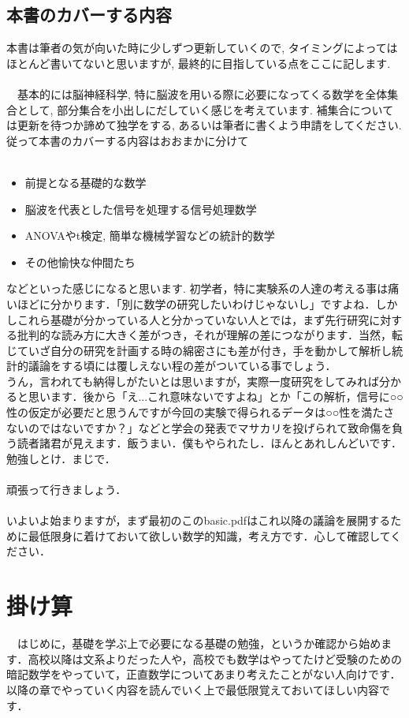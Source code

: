 \documentclass[11pt,a4paper]{jreport}
\begin{document}
\section{本書のカバーする内容}
本書は筆者の気が向いた時に少しずつ更新していくので, タイミングによってはほとんど書いてないと思いますが, 最終的に目指している点をここに記します.\\
\\
　基本的には脳神経科学, 特に脳波を用いる際に必要になってくる数学を全体集合として, 部分集合を小出しにだしていく感じを考えています. 補集合については更新を待つか諦めて独学をする, あるいは筆者に書くよう申請をしてください. 従って本書のカバーする内容はおおまかに分けて\\
\\
\begin{screen}
\begin{itemize}
 \item 前提となる基礎的な数学
 \item 脳波を代表とした信号を処理する信号処理数学
 \item ANOVAやt検定, 簡単な機械学習などの統計的数学
 \item その他愉快な仲間たち
\end{itemize}
\end{screen}

などといった感じになると思います. 初学者，特に実験系の人達の考える事は痛いほどに分かります．「別に数学の研究したいわけじゃないし」ですよね．しかしこれら基礎が分かっている人と分かっていない人とでは，まず先行研究に対する批判的な読み方に大きく差がつき，それが理解の差につながります．当然，転じていざ自分の研究を計画する時の綿密さにも差が付き，手を動かして解析し統計的議論をする頃には覆しえない程の差がついている事でしょう．\\
うん，言われても納得しがたいとは思いますが，実際一度研究をしてみれば分かると思います．後から「え...これ意味ないですよね」とか「この解析，信号に○○性の仮定が必要だと思うんですが今回の実験で得られるデータは○○性を満たさないのではないですか？」などと学会の発表でマサカリを投げられて致命傷を負う読者諸君が見えます．飯うまい．僕もやられたし．ほんとあれしんどいです．勉強しとけ．まじで．\\
\\
頑張って行きましょう．
\\
\\
いよいよ始まりますが，まず最初のこのbasic.pdfはこれ以降の議論を展開するために最低限身に着けておいて欲しい数学的知識，考え方です．心して確認してください．
\chapter{掛け算}
　はじめに，基礎を学ぶ上で必要になる基礎の勉強，というか確認から始めます．高校以降は文系よりだった人や，高校でも数学はやってたけど受験のための暗記数学をやっていて，正直数学についてあまり考えたことがない人向けです．以降の章でやっていく内容を読んでいく上で最低限覚えておいてほしい内容です．
\end{document}
